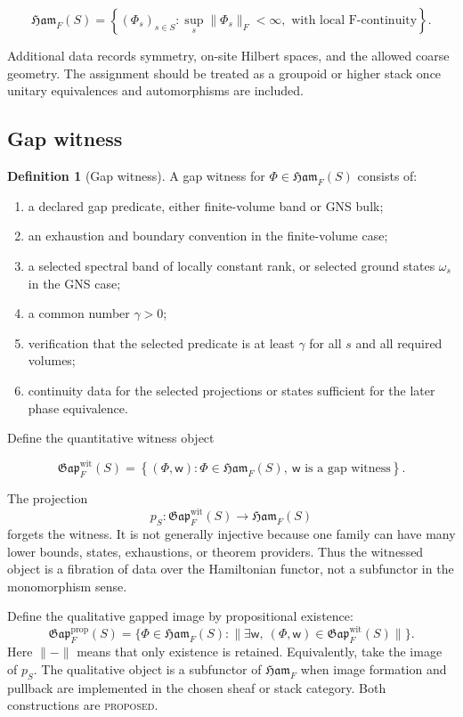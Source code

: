\documentclass[12pt]{article}
\theoremstyle{definition}
\newtheorem{definition}[theorem]{Definition}
\theoremstyle{remark}
\newcommand{\Ham}{\mathfrak{Ham}}
\newcommand{\Gap}{\mathfrak{Gap}}
\newcommand{\status}[1]{\textsc{#1}}
\begin{document}
\[
\Ham_F(S)
=
\left\{
(\Phi_s)_{s\in S}:
\sup_s\|\Phi_s\|_F<\infty,
\text{ with local F-continuity}
\right\}.
\]

Additional data records symmetry, on-site Hilbert spaces, and the allowed
coarse geometry. The assignment should be treated as a groupoid or higher
stack once unitary equivalences and automorphisms are included.

\subsection{Gap witness}

\begin{definition}[Gap witness]
A gap witness for $\Phi\in\Ham_F(S)$ consists of:

\begin{enumerate}[label=(\roman*)]
  \item a declared gap predicate, either finite-volume band or GNS bulk;
  \item an exhaustion and boundary convention in the finite-volume case;
  \item a selected spectral band of locally constant rank, or selected ground
  states $\omega_s$ in the GNS case;
  \item a common number $\gamma>0$;
  \item verification that the selected predicate is at least $\gamma$ for all
  $s$ and all required volumes;
  \item continuity data for the selected projections or states sufficient for
  the later phase equivalence.
\end{enumerate}
\end{definition}

Define the quantitative witness object

\[
\Gap_F^{\mathrm{wit}}(S)
=
\left\{
(\Phi,\mathsf w):
\Phi\in\Ham_F(S),
\ \mathsf w\text{ is a gap witness}
\right\}.
\]

The projection
\[
p_S:\Gap_F^{\mathrm{wit}}(S)\longrightarrow\Ham_F(S)
\]
forgets the witness. It is not generally injective because one family can have
many lower bounds, states, exhaustions, or theorem providers. Thus the
witnessed object is a fibration of data over the Hamiltonian functor, not a
subfunctor in the monomorphism sense.

Define the qualitative gapped image by propositional existence:
\[
\Gap_F^{\mathrm{prop}}(S)
=
\{\Phi\in\Ham_F(S):\|\exists\mathsf w,\
(\Phi,\mathsf w)\in\Gap_F^{\mathrm{wit}}(S)\|\}.
\]
Here $\|{-}\|$ means that only existence is retained. Equivalently, take the
image of $p_S$. The qualitative object is a subfunctor of $\Ham_F$ when image
formation and pullback are implemented in the chosen sheaf or stack category.
Both constructions are \status{proposed}.
\end{document}

